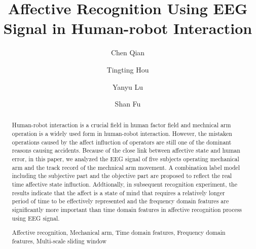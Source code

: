 \documentclass[runningheads,a4paper]{llncs}
\newcommand{\keywords}[1]{\par\addvspace\baselineskip
\noindent\keywordname\enspace\ignorespaces#1}
\begin{document}
\mainmatter

\title{ Affective Recognition Using EEG Signal in Human-robot Interaction }

\author{Chen Qian\and Tingting Hou\and Yanyu Lu \and Shan Fu }


\maketitle
\begin{abstract}
Human-robot interaction is a crucial field in human factor field and mechnical
arm operation is a widely used form in human-robot interaction.
However, the mistaken operations caused by the affect influction
of operators are still one of the dominant reasons causing accidents. Because of
the close link between affective state and human error, in this paper, we analyzed
the EEG signal of five subjects operating mechanical arm and the track record of
the mechnical arm movement. A combination label model including the subjective part and
the objective part are proposed to reflect the real time affective state influction. Addtionally,
in subsequent recognition experiment, the results indicate that the affect is
a state of mind that requires a relatively longer period of time to be effectively represented
and the frequency domain features are significantly more important than time domain features
in affective recognition process using EEG signal.
\keywords{Affective recognition, Mechanical arm, Time domain features,
Frequency domain features, Multi-scale sliding window}
\end{abstract}
\end{document}
